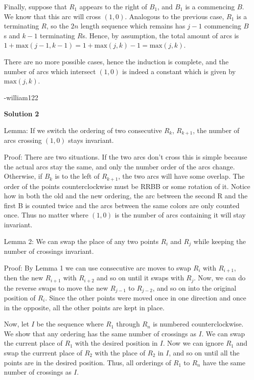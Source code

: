 \begin{enumerate}
 Finally, suppose that $R_1$ appears to the right of $B_1$, and $B_1$ is a commencing $B$. We know that this arc will cross $(1,0)$. Analogous to the previous case, $R_1$ is a terminating $R$, so the $2n$ length sequence which remains has $j-1$ commencing $B$s and $k-1$ terminating $R$s. Hence, by assumption, the total amount of arcs is $1+\text{max}(j-1,k-1)=1+\text{max}(j,k)-1=\text{max}(j,k)$.

 There are no more possible cases, hence the induction is complete, and the number of arcs which intersect $(1,0)$ is indeed a constant which is given by $\text{max}(j,k)$.

 -william122

 



\textbf{Solution 2}

Lemma: If we switch the ordering of two consecutive $R_k$, $R_{k+1}$, the number of arcs crossing $(1,0)$ stays invariant.

 Proof: There are two situations. If the two arcs don't cross this is simple because the actual arcs stay the same, and only the number order of the arcs change. Otherwise, if $B_k$ is to the left of $R_{k+1}$, the two arcs will have some overlap. The order of the points counterclockwise must be RRBB or some rotation of it. Notice how in both the old and the new ordering, the arc between the second R and the first B is counted twice and the arcs between the same colors are only counted once. Thus no matter where $(1,0)$ is the number of arcs containing it will stay invariant.

 Lemma 2: We can swap the place of any two points $R_i$ and $R_j$ while keeping the number of crossings invariant.

 Proof: By Lemma 1 we can use consecutive arc moves to swap $R_i$ with $R_{i+1}$, then the new $R_{i+1}$ with $R_{i+2}$ and so on until it swaps with $R_j$. Now, we can do the reverse swaps to move the new $R_{j-1}$ to $R_{j-2}$, and so on into the original position of $R_i$. Since the other points were moved once in one direction and once in the opposite, all the other points are kept in place.

 Now, let $I$ be the sequence where $R_1$ through $R_n$ is numbered counterclockwise. We show that any ordering has the same number of crossings as $I$. We can swap the current place of $R_1$ with the desired position in $I$. Now we can ignore $R_1$ and swap the currrent place of $R_2$ with the place of $R_2$ in $I$, and so on until all the points are in the desired position. Thus, all orderings of $R_1$ to $R_n$ have the same number of crossings as $I$.


\end{enumerate}
